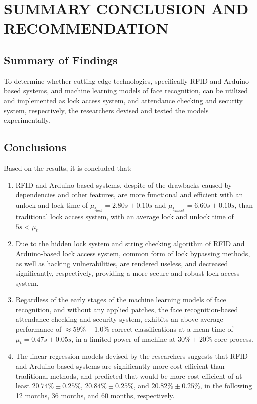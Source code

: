\documentclass[12pt]{article}
\begin{document}
\newpage
\section*{SUMMARY CONCLUSION AND RECOMMENDATION\centering}

\subsection*{Summary of Findings\centering}

To determine whether cutting edge technologies, specifically RFID and Arduino-based systems, and machine learning models of face recognition, can be utilized and implemented as lock access system, and attendance checking and security system, respectively, the researchers devised and tested the models experimentally.

\subsection*{Conclusions\centering}

Based on the results, it is concluded that:

\begin{enumerate}
	\item RFID and Arduino-based systems, despite of the drawbacks caused by dependencies and other features, are more functional and efficient with an unlock and lock time of $\mu_{t_{lock}} = 2.80s \pm 0.10s$ and $\mu_{t_{unlock}} = 6.60s \pm 0.10s$, than traditional lock access system, with an average lock and unlock time of $5s < \mu_t$
	
	\item Due to the hidden lock system and string checking algorithm of RFID and Arduino-based lock access system, common form of lock bypassing methods, as well as hacking vulnerabilities, are rendered useless, and decreased significantly, respectively, providing a more secure and robust lock access system.
	
	\item Regardless of the early stages of the machine learning models of face recognition, and without any applied patches, the face recognition-based attendance checking and security system, exhibits an above average performance of $\approx 59\% \pm 1.0\%$ correct classifications at a mean time of $\mu_{t} = 0.47s \pm 0.05s$, in a limited power of machine at $30\% \pm 20\%$ core process.
		
	\item The linear regression models devised by the researchers suggests that RFID and Arduino based systems are significantly more cost efficient than traditional methods, and predicted that would be more cost efficient of at least $20.74\% \pm 0.25\%$, $20.84\% \pm 0.25\%$, and $20.82\% \pm 0.25\%$, in the following 12 months, 36 months, and 60 months, respectively.
	
\end{enumerate}
\end{document}

